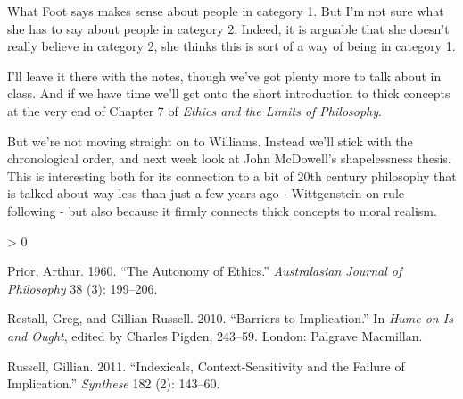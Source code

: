 \documentclass[
]{article}
\newlength{\cslhangindent}
\newenvironment{CSLReferences}[2] %
 {%
  \setlength{\parindent}{0pt}
  \ifodd #1 \everypar{\setlength{\hangindent}{\cslhangindent}}\ignorespaces\fi
  \ifnum #2 > 0
  \setlength{\parskip}{#2\baselineskip}
  \fi
 }%
 {}
\begin{document}
What Foot says makes sense about people in category 1. But I'm not sure
what she has to say about people in category 2. Indeed, it is arguable
that she doesn't really believe in category 2, she thinks this is sort
of a way of being in category 1.

I'll leave it there with the notes, though we've got plenty more to talk
about in class. And if we have time we'll get onto the short
introduction to thick concepts at the very end of Chapter 7 of
\emph{Ethics and the Limits of Philosophy}.

But we're not moving straight on to Williams. Instead we'll stick with
the chronological order, and next week look at John McDowell's
shapelessness thesis. This is interesting both for its connection to a
bit of 20th century philosophy that is talked about way less than just a
few years ago - Wittgenstein on rule following - but also because it
firmly connects thick concepts to moral realism.

\hypertarget{refs}{}
\begin{CSLReferences}{1}{0}
\leavevmode\hypertarget{ref-Prior1960}{}%
Prior, Arthur. 1960. {``The Autonomy of Ethics.''} \emph{Australasian
Journal of Philosophy} 38 (3): 199--206.

\leavevmode\hypertarget{ref-RestallRussell2010}{}%
Restall, Greg, and Gillian Russell. 2010. {``Barriers to Implication.''}
In \emph{Hume on Is and Ought}, edited by Charles Pigden, 243--59.
London: Palgrave Macmillan.

\leavevmode\hypertarget{ref-Russell2011}{}%
Russell, Gillian. 2011. {``Indexicals, Context-Sensitivity and the
Failure of Implication.''} \emph{Synthese} 182 (2): 143--60.

\end{CSLReferences}
\end{document}
